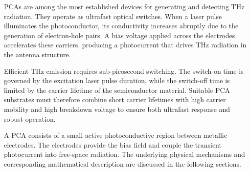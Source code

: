 
PCAs are among the most established devices for generating and detecting THz radiation. They operate as ultrafast optical switches. When a laser pulse illuminates the photoconductor, its conductivity increases abruptly due to the generation of electron-hole pairs. A bias voltage applied across the electrodes accelerates these carriers, producing a photocurrent that drives THz radiation in the antenna structure.  

Efficient THz emission requires sub-picosecond switching. The switch-on time is governed by the excitation laser pulse duration, while the switch-off time is limited by the carrier lifetime of the semiconductor material. Suitable PCA substrates must therefore combine short carrier lifetimes with high carrier mobility and high breakdown voltage to ensure both ultrafast response and robust operation.  

A PCA consists of a small active photoconductive region between metallic electrodes. The electrodes provide the bias field and couple the transient photocurrent into free-space radiation. The underlying physical mechanisms and corresponding mathematical description are discussed in the following sections.



